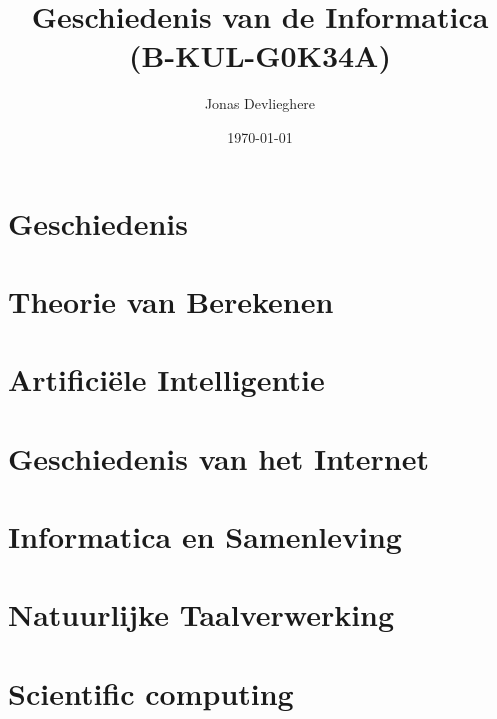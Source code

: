 \documentclass[11pt]{article}
\title{Geschiedenis van de Informatica \\ (B-KUL-G0K34A)}
\date{\today}
\author{Jonas Devlieghere}
\theoremstyle{definition}
\begin{document}
\maketitle

\tableofcontents

\newpage

\section{Geschiedenis}




\section{Theorie van Berekenen}


\section{Artifici\"ele Intelligentie}


\section{Geschiedenis van het Internet}


\section{Informatica en Samenleving}


\section{Natuurlijke Taalverwerking}


\section{Scientific computing}


\appendix

\printindex



\nocite{*}
\end{document}
